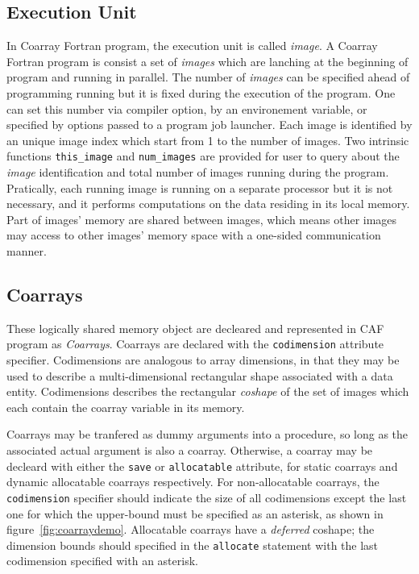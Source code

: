 \subsection{Execution Unit}
In Coarray Fortran program, the execution unit is called \emph{image}. A Coarray Fortran program is consist a set of \emph{images} which are lanching at the beginning of program and running in parallel. The number of \emph{images} can be specified ahead of programming running but it is fixed during the execution of the program. One can set this number via compiler option, by an environement variable, or specified by options passed to a program job launcher. Each image is identified by an unique image index which start from 1 to the number of images. Two intrinsic functions \texttt{this\_image} and \texttt{num\_images} are provided for user to query about the \emph{image} identification and total number of images running during the program. Pratically, each running image is running on a separate processor but it is not necessary, and it performs computations on the data residing in its local memory. Part of images' memory are shared between images, which means other images may access to other images' memory space with a one-sided communication manner.  

\subsection{Coarrays}
These logically shared memory object are decleared and represented in CAF program as \emph{Coarrays}. Coarrays are declared with the \texttt{codimension} attribute specifier. Codimensions are analogous to array dimensions, in that they may be used to describe a multi-dimensional rectangular shape associated with a data entity. Codimensions describes the rectangular \emph{coshape} of the set of images which each contain the coarray variable in its memory. 

Coarrays may be tranfered as dummy arguments into a procedure, so long as the associated actual argument is also a coarray. Otherwise, a coarray may be decleard with either the \texttt{save} or \texttt{allocatable} attribute, for static coarrays and dynamic allocatable coarrays respectively. For non-allocatable coarrays, the \texttt{codimension} specifier should indicate the size of all codimensions except the last one for which the upper-bound must be specified as an asterisk, as shown in figure~\ref{fig:coarraydemo}. Allocatable coarrays have a \emph{deferred} coshape; the dimension bounds should specified in the \texttt{allocate} statement with the last codimension specified with an asterisk. 

